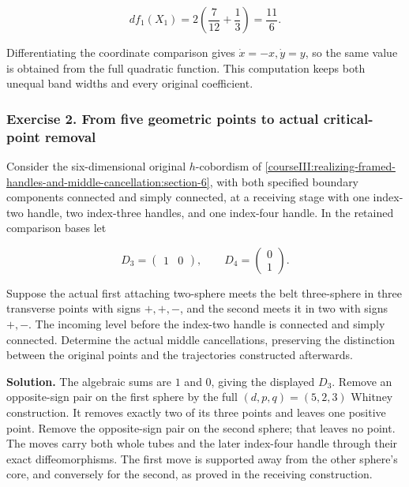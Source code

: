 \begin{equation}
df_1(X_1)=2\left(\frac7{12}+\frac13\right)=\frac{11}{6}.
 \label{courseIII:realizing-framed-handles-and-middle-cancellation:eq:7.9}
\end{equation}

Differentiating the coordinate comparison gives \(\dot x=-x,\dot y=y\), so the same value is obtained from the full quadratic function. This computation keeps both unequal band widths and every original coefficient.

\subsubsection{Exercise 2. From five geometric points to actual critical-point removal}
\label{courseIII:realizing-framed-handles-and-middle-cancellation:exercise-2}

\label{courseIII:middle-cancel:7.2}

Consider the six-dimensional original \(h\)-cobordism of \cref{courseIII:realizing-framed-handles-and-middle-cancellation:section-6}, with both specified boundary components connected and simply connected, at a receiving stage with one index-two handle, two index-three handles, and one index-four handle. In the retained comparison bases let

\begin{equation}
D_3=\begin{pmatrix}1&0\end{pmatrix},\qquad
 D_4=\begin{pmatrix}0\\1\end{pmatrix}.
 \label{courseIII:realizing-framed-handles-and-middle-cancellation:eq:7.10}
\end{equation}

Suppose the actual first attaching two-sphere meets the belt three-sphere in three transverse points with signs \(+,+,-\), and the second meets it in two with signs \(+,-\). The incoming level before the index-two handle is connected and simply connected. Determine the actual middle cancellations, preserving the distinction between the original points and the trajectories constructed afterwards.

\textbf{Solution.} The algebraic sums are \(1\) and \(0\), giving the displayed \(D_3\). Remove an opposite-sign pair on the first sphere by the full \((d,p,q)=(5,2,3)\) Whitney construction. It removes exactly two of its three points and leaves one positive point. Remove the opposite-sign pair on the second sphere; that leaves no point. The moves carry both whole tubes and the later index-four handle through their exact diffeomorphisms. The first move is supported away from the other sphere's core, and conversely for the second, as proved in the receiving construction.

